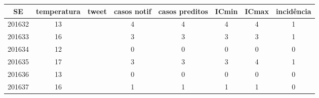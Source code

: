 \begin{tabular}{c|ccccccc}
  \hline
SE & temperatura & tweet & casos notif & casos preditos & ICmin & ICmax & incidência \\ 
  \hline
201632 & 13 &  & 4 & 4 & 4 & 4 & 1 \\ 
  201633 & 16 &  & 3 & 3 & 3 & 3 & 1 \\ 
  201634 & 12 &  & 0 & 0 & 0 & 0 & 0 \\ 
  201635 & 17 &  & 3 & 3 & 3 & 4 & 1 \\ 
  201636 & 13 &  & 0 & 0 & 0 & 0 & 0 \\ 
  201637 & 16 &  & 1 & 1 & 1 & 1 & 0 \\ 
   \hline
\end{tabular}
